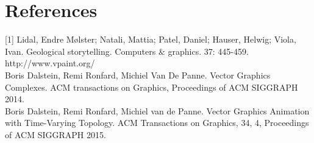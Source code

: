 \documentclass[a4paper,11pt]{article}
\begin{document}
\section{References}

[1] Lidal, Endre Mølster; Natali, Mattia; Patel, Daniel; Hauser, Helwig; Viola, Ivan.
Geological storytelling. Computers \& graphics. 37: 445-459.\\

\noindent[2] http://www.vpaint.org/ \\

\noindent[3] Boris Dalstein, Remi Ronfard, Michiel Van De Panne. Vector Graphics Complexes. ACM transactions on
Graphics, Proceedings of ACM SIGGRAPH 2014.\\

\noindent[4] Boris Dalstein, Remi Ronfard, Michiel van de Panne. Vector Graphics Animation with Time-Varying Topology.
ACM Transactions on Graphics, 34, 4, Proceedings of ACM SIGGRAPH 2015.
\end{document}

